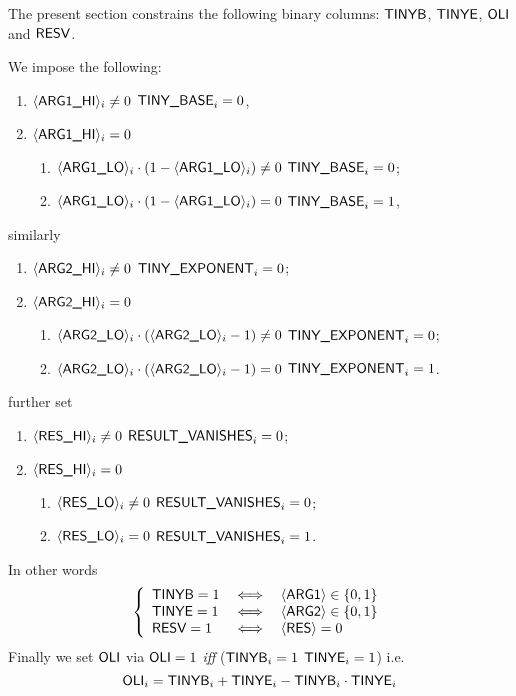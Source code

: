 The present section constrains the following binary columns: $\tinyBase$, $\tinyExponent$, $\oli{}$ and $\resVanishes$.
\begin{center}
\end{center}
We impose the following:
\begin{enumerate}
	\item \If $\iArgOneHi_{i} \neq 0$ \Then $\TINYBASE_{i} = 0$,
	\item \If $\iArgOneHi_{i} =    0$ \Then
		\begin{enumerate}
			\item \If $\iArgOneLo_{i} \cdot (1 - \iArgOneLo_{i}) \neq 0$ \Then $\TINYBASE_{i} = 0$;
			\item \If $\iArgOneLo_{i} \cdot (1 - \iArgOneLo_{i}) =    0$ \Then $\TINYBASE_{i} = 1$,
		\end{enumerate}
\end{enumerate}
similarly
\begin{enumerate}
	\item \If $\iArgTwoHi_{i} \neq 0$ \Then $\TINYEXPONENT_{i} = 0$;
	\item \If $\iArgTwoHi_{i} =    0$ \Then
		\begin{enumerate}
			\item \If $\iArgTwoLo_{i} \cdot (\iArgTwoLo_{i} - 1) \neq 0$ \Then $\TINYEXPONENT_{i} = 0$;
			\item \If $\iArgTwoLo_{i} \cdot (\iArgTwoLo_{i} - 1) =    0$ \Then $\TINYEXPONENT_{i} = 1$.
		\end{enumerate}
\end{enumerate}
further set
\begin{enumerate}
	\item \If $\iResHi_{i} \neq 0$ \Then $\RESVANISHES_{i} = 0$;
	\item \If $\iResHi_{i} =    0$ \Then
		\begin{enumerate}
			\item \If $\iResLo_{i} \neq 0$ \Then $\RESVANISHES_{i} = 0$;
			\item \If $\iResLo_{i} =    0$ \Then $\RESVANISHES_{i} = 1$.
		\end{enumerate}
\end{enumerate}
In other words
\[
	\left\{ \begin{array}{lcl}
		\tinyBase = 1 & \iff & \iArgOne \in \{0,1\} \\
		\tinyExponent = 1 & \iff & \iArgTwo \in \{0,1\} \\
		\resVanishes = 1 & \iff & \iRes = 0 \\
	\end{array} \right.
\]
Finally we set $\oli$ via $\oli = 1$ \emph{iff} \big($\tinyBase_{i} = 1$ \OR{} $\tinyExponent_{i} = 1$\big) i.e.
\[
	\oli_{i} =
	\tinyBase_{i} + \tinyExponent_{i} - \tinyBase_{i} \cdot \tinyExponent_{i}
\]
